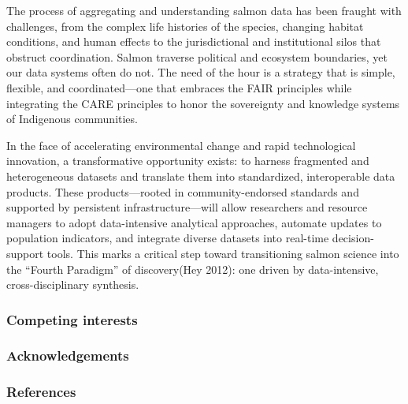 \documentclass[
  letterpaper,
  DIV=11,
  numbers=noendperiod]{scrartcl}
\begin{document}
The process of aggregating and understanding salmon data has been
fraught with challenges, from the complex life histories of the species,
changing habitat conditions, and human effects to the jurisdictional and
institutional silos that obstruct coordination. Salmon traverse
political and ecosystem boundaries, yet our data systems often do not.
The need of the hour is a strategy that is simple, flexible, and
coordinated---one that embraces the FAIR principles while integrating
the CARE principles to honor the sovereignty and knowledge systems of
Indigenous communities.

In the face of accelerating environmental change and rapid technological
innovation, a transformative opportunity exists: to harness fragmented
and heterogeneous datasets and translate them into standardized,
interoperable data products. These products---rooted in
community-endorsed standards and supported by persistent
infrastructure---will allow researchers and resource managers to adopt
data-intensive analytical approaches, automate updates to population
indicators, and integrate diverse datasets into real-time
decision-support tools. This marks a critical step toward transitioning
salmon science into the ``Fourth Paradigm'' of discovery(Hey 2012): one
driven by data-intensive, cross-disciplinary synthesis.

\subsubsection{Competing interests}\label{competing-interests}

\subsubsection{Acknowledgements}\label{acknowledgements}

\subsubsection{References}\label{references}
\end{document}

